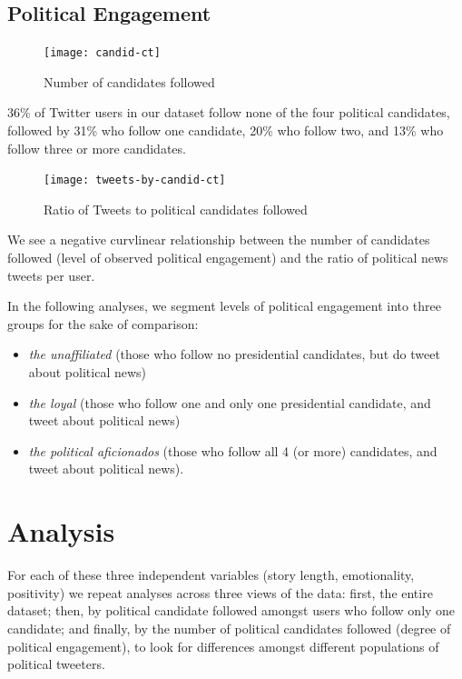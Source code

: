 \documentclass[letterpaper]{article}
\begin{document}
\subsection{Political Engagement}



\begin{figure}[t!]  
\centering 
  \texttt{[image: candid-ct]}  
  \caption{Number of candidates followed
    \label{fig:candid-ct}}
\end{figure}

36\% of Twitter users in our dataset follow none of the four political candidates, followed by 31\% who follow one candidate, 20\% who follow two, and 13\% who follow three or more candidates. 


\begin{figure}[t!]  
\centering 
  \texttt{[image: tweets-by-candid-ct]}  
  \caption{Ratio of Tweets to political candidates followed
    \label{fig:candid-ct}}
\end{figure}

We see a negative curvlinear relationship between the number of candidates followed (level of observed political engagement) and the ratio of political news tweets per user.


In the following analyses, we segment levels of political engagement into three groups for the sake of comparison:

\begin{itemize}
  \item \emph{the unaffiliated} (those who follow no presidential candidates, but do tweet about political news)
  \item \emph{the loyal} (those who follow one and only one presidential candidate, and tweet about political news)
  \item \emph{the political aficionados} (those who follow all 4 (or more) candidates, and tweet about political news).
\end{itemize}


\section{Analysis} 
For each of these three independent variables (story length, emotionality, positivity) we repeat analyses across three views of the data: first, the entire dataset; then, by political candidate followed amongst users who follow only one candidate; and finally, by the number of political candidates followed (degree of political engagement), to look for differences amongst different populations of political tweeters.
\end{document}
